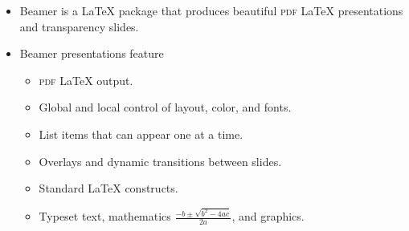 \documentclass{article}
\begin{document}

\begin{slide}%

\begin{itemize}
\item Beamer is a 
\LaTeX{}
package that produces beautiful \textsc{pdf}%
\LaTeX{}
presentations and transparency slides.

\item Beamer presentations feature

\begin{itemize}
\item \textsc{pdf}%
\LaTeX{}
output.

\item Global and local control of layout, color, and fonts.

\item List items that can appear one at a time.

\item Overlays and dynamic transitions between slides.

\item Standard 
\LaTeX{}
constructs.

\item Typeset text, mathematics $\frac{-b\pm \sqrt{b^{2}-4ac}}{2a}$, and
graphics.
\end{itemize}
\end{itemize}

\end{slide}%
\end{document}
